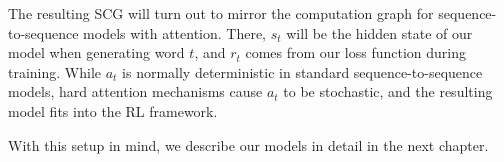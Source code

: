 \documentclass[12pt]{report}
\begin{document}
The resulting SCG will turn out to mirror the computation graph for sequence-to-sequence models with attention. There, $s_t$ will be the hidden state of our model when generating word $t$, and $r_t$ comes from our loss function during training. While $a_t$ is normally deterministic in standard sequence-to-sequence models, hard attention mechanisms cause $a_t$ to be stochastic, and the resulting model fits into the RL framework.


With this setup in mind, we describe our models in detail in the next chapter.

%
%

%
%
\end{document}
